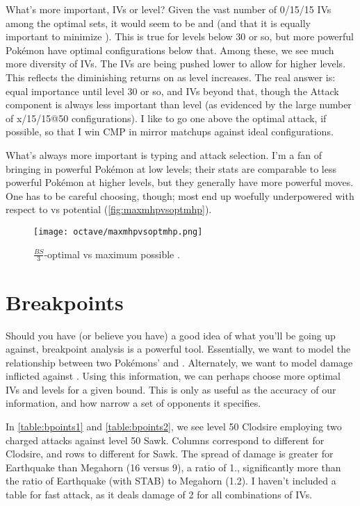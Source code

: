 What's more important, IVs or level?
Given the vast number of 0/15/15 IVs among the optimal sets, it
  would seem to be  and  (and that it is equally
  important to minimize ).
This is true for levels below 30 or so, but more powerful Pokémon
  have optimal configurations below that.
Among these, we see much more diversity of IVs.
The IVs are being pushed lower to allow for higher levels.
This reflects the diminishing returns on \CPM{} as level increases.
The real answer is: equal importance until level 30 or so, and IVs beyond that,
  though the Attack component is always less important than level
  (as evidenced by the large number of x/15/15@50 configurations).
I like to go one above the optimal attack, if possible, so that I
  win CMP in mirror matchups against ideal configurations.

What's always more important is typing and attack selection.
I'm a fan of bringing in powerful Pokémon at low levels; their stats are
  comparable to less powerful Pokémon at higher levels, but they
  generally have more powerful moves.
One has to be careful choosing, though; most end up woefully underpowered
  with respect to \MHP{} vs potential \MHP{} (\autoref{fig:maxmhpvsoptmhp}).
\begin{figure}
\texttt{[image: octave/maxmhpvsoptmhp.png]}
  \caption{$\frac{\mathit{BS}}{3}$-optimal \MHP{} vs maximum possible \MHP.\label{fig:maxmhpvsoptmhp}}
\end{figure}

\section{Breakpoints\label{sec:breakpoints}}
Should you have (or believe you have) a good idea of what you'll be going up against,
 breakpoint analysis is a powerful tool.
Essentially, we want to model the relationship between two Pokémons' 
 and .
Alternately, we want to model damage inflicted against \MHP\@.
Using this information, we can perhaps choose more optimal IVs and levels for a given \CP{} bound.
This is only as useful as the accuracy of our information, and how narrow a set of opponents it specifies.

In \autoref{table:bpoints1} and \autoref{table:bpoints2}, we see level 50 Clodsire
  employing two charged attacks against level 50 Sawk.
Columns correspond to different  for Clodsire, and rows to different  for Sawk.
The spread of damage is greater for Earthquake than Megahorn (16 versus 9), a ratio
  of 1., significantly more than the ratio of Earthquake (with STAB)
  to Megahorn (1.2).
I haven't included a table for fast attack, as it deals damage of 2 for all combinations of IVs.

